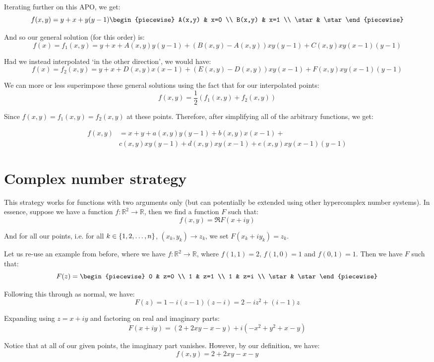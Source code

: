 \begin{example}
    Iterating further on this APO, we get:
    $$
        f(x,y)=y+x+y(y-1)\begin{piecewise}
            A(x,y) & x=0 \\
            B(x,y) & x=1 \\
            \star & \star
        \end{piecewise}
    $$

    And so our general solution (for this order) is:
    $$
        f(x)=f_1(x,y)=y+x+A(x,y)y(y-1)+(B(x,y)-A(x,y))xy(y-1)+C(x,y)xy(x-1)(y-1)
    $$

    Had we instead interpolated `in the other direction', we would have:
    $$
        f(x)=f_2(x,y)=y+x+D(x,y)x(x-1)+(E(x,y)-D(x,y))xy(x-1)+F(x,y)xy(x-1)(y-1)
    $$

    We can more or less superimpose these general solutions using the fact that for our interpolated points:
    $$
        f(x,y)=\frac{1}{2}(f_1(x,y)+f_2(x,y))
    $$

    Since $f(x,y)=f_1(x,y)=f_2(x,y)$ at these points. Therefore, after simplifying all of the arbitrary functions, we get:

    \begin{align*}
        f(x,y) &= x+y+a(x,y)y(y-1)+b(x,y)x(x-1)+ \\
        & c(x,y)xy(y-1)+d(x,y)xy(x-1)+e(x,y)xy(x-1)(y-1)
    \end{align*}
\end{example}

\section{Complex number strategy}
This strategy works for functions with two arguments only (but can potentially be extended using other hypercomplex number systems). In essence, suppose we have a function $f:\mathbb{R}^2\to\mathbb{R}$, then we find a function $F$ such that:
$$
    f(x,y)=\Re{F(x+iy)}
$$

And for all our points, i.e. for all $k\in\{1,2,\dots,n\}$, $(x_k,y_k)\to z_k$, we set $F(x_k+iy_k)=z_k$.

\begin{example}
    Let us re-use an example from before, where we have $f:\mathbb{R}^2\to\mathbb{R}$, where $f(1,1)=2$, $f(1,0)=1$ and $f(0,1)=1$. Then we have $F$ such that:
    $$
        F(z) = \begin{piecewise}
            0 & z=0 \\
            1 & z=1 \\
            1 & z=i \\
            \star & \star
        \end{piecewise}
    $$

    Following this through as normal, we have:
    $$
        F(z)=1-i(z-1)(z-i)=2-iz^2+(i-1)z
    $$

    Expanding using $z=x+iy$ and factoring on real and imaginary parts:
    $$
        F(x+iy) = (2+2xy-x-y)+i(-x^2+y^2+x-y)
    $$

    Notice that at all of our given points, the imaginary part vanishes. However, by our definition, we have:
    $$
        f(x,y)=2+2xy-x-y
    $$
\end{example}

